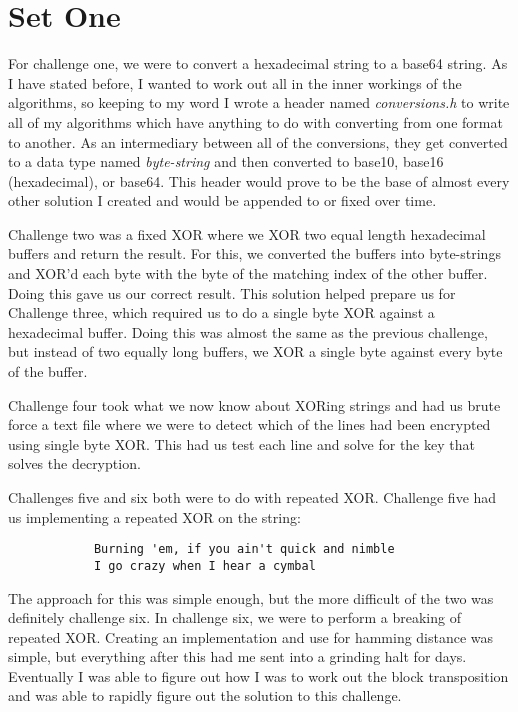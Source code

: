 \documentclass{report}
\begin{document}
	\section*{Set One}
		For challenge one, we were to convert a hexadecimal string to a base64 string. As I have stated before, I wanted to work out all in the inner workings of the algorithms, so keeping to my word I wrote a header named \textit{conversions.h} to write all of my algorithms which have anything to do with converting from one format to another. As an intermediary between all of the conversions, they get converted to a data type named \textit{byte-string} and then converted to base10, base16 (hexadecimal), or base64. This header would prove to be the base of almost every other solution I created and would be appended to or fixed over time. 
		\par
		Challenge two was a fixed XOR where we XOR two equal length hexadecimal buffers and return the result. For this, we converted the buffers into byte-strings and XOR'd each byte with the byte of the matching index of the other buffer. Doing this gave us our correct result. This solution helped prepare us for Challenge three, which required us to do a single byte XOR against a hexadecimal buffer. Doing this was almost the same as the previous challenge, but instead of two equally long buffers, we XOR a single byte against every byte of the buffer. 
		\par 
		Challenge four took what we now know about XORing strings and had us brute force a text file where we were to detect which of the lines had been encrypted using single byte XOR. This had us test each line and solve for the key that solves the decryption.
		\par 
		Challenges five and six both were to do with repeated XOR. Challenge five had us implementing a repeated XOR on the string:
		\begin{verbatim}
			Burning 'em, if you ain't quick and nimble
			I go crazy when I hear a cymbal
		\end{verbatim} 
		The approach for this was simple enough, but the more difficult of the two was definitely challenge six. In challenge six, we were to perform a breaking of repeated XOR. Creating an implementation and use for hamming distance was simple, but everything after this had me sent into a grinding halt for days. Eventually I was able to figure out how I was to work out the block transposition and was able to rapidly figure out the solution to this challenge.
		\par 
\end{document}
